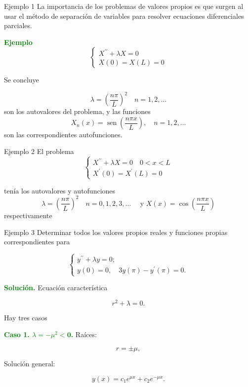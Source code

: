 \documentclass[xcolor=dvipsnames,a4paper,10pt,handout]{beamer}
\renewcommand{\textbf}[1]{\textcolor{green}{\bfseries #1}}
\begin{document}
\begin{frame}{ Ejemplo 1}
\onslide<+->
La importancia de los problemas de valores propios es que surgen al usar el método de separación de variables para resolver ecuaciones diferenciales parciales.
\onslide<+->

\textbf{Ejemplo }
$$
\left\{\begin{array}{r}
X^{\prime \prime}+\lambda X=0 \\
X(0)=X(L)=0
\end{array}\right.
$$

Se concluye


$$
\lambda=\left(\frac{n \pi}{L}\right)^{2} \quad n=1,2, \ldots
$$
son los autovalores del problema, y las funciones
$$
X_{n}(x)=\operatorname{sen}\left(\frac{n \pi x}{L}\right), \quad n=1,2, \ldots
$$
son las correspondientes autofunciones.
\end{frame}


 

\begin{frame}{ Ejemplo 2}
El problema 
$$
\left\{\begin{array}{l}
X^{\prime \prime}+\lambda X=0\quad 0<x<L \\
X^{\prime}(0)=X^{\prime}(L)=0
\end{array} \right.
$$

tenía los autovalores y autofunciones 
$$
\lambda=\left(\frac{n \pi}{L}\right)^{2} \quad n=0,1,2,3, \ldots \quad \text { y } X(x)=\cos \left(\frac{n \pi x}{L}\right)
$$
respectivamente 



\end{frame}


 

\begin{frame}{Ejemplo 3}
\onslide<+->
 Determinar todos los valores propios reales y funciones propias correspondientes para
 
 $$
\left\{\begin{array}{l}
            y^{\prime \prime}+\lambda y=0;\\
            y(0)=0, \quad 3 y(\pi)-y^{\prime}(\pi)=0.
\end{array} \right.
$$
\onslide<+->

\textbf{Solución.} Ecuación característica 

$$r^{2}+\lambda=0.$$

Hay tres casos

\textbf{Caso 1. $\lambda=-\mu^{2}<\mathbf{0}$.} Raíces:

$$r=\pm \mu,$$

Solución general:

$$y(x)=c_{1} e^{\mu x}+c_{2} e^{-\mu x}.$$ 
\end{frame}
\end{document}

